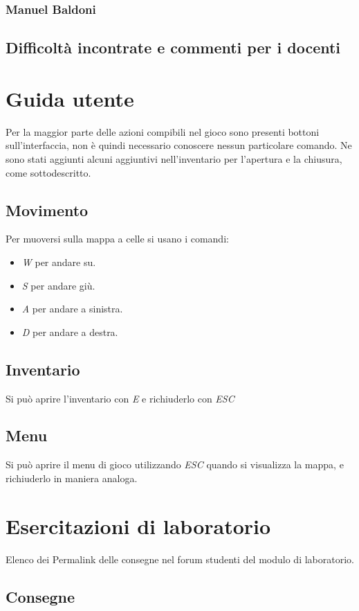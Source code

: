 \documentclass[a4paper,12pt]{report}
\begin{document}
\subsection{Manuel Baldoni}

\section{Difficoltà incontrate e commenti per i docenti}

\appendix
\chapter{Guida utente}
Per la maggior parte delle azioni compibili nel gioco sono presenti bottoni sull'interfaccia, non è quindi necessario conoscere nessun particolare comando. Ne sono stati aggiunti alcuni aggiuntivi nell'inventario per l'apertura e la chiusura, come sottodescritto.
\section{Movimento}
Per muoversi sulla mappa a celle si usano i comandi:
\begin{itemize}
	\item \textit{W} per andare su.
	\item \textit{S} per andare giù.
	\item \textit{A} per andare a sinistra.
	\item \textit{D} per andare a destra.
\end{itemize}
\section{Inventario}
Si può aprire l'inventario con \textit{E} e richiuderlo con \textit{ESC}
\section{Menu}
Si può aprire il menu di gioco utilizzando \textit{ESC} quando si visualizza la mappa, e richiuderlo in maniera analoga.

\chapter{Esercitazioni di laboratorio}
Elenco dei Permalink delle consegne nel forum studenti del modulo di laboratorio.
\section*{Consegne}
\end{document}
